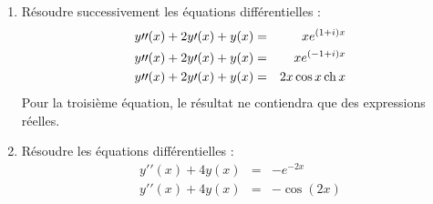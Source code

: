 \begin{enumerate}
 \item Résoudre successivement les équations différentielles :
\begin{eqnarray*}
 y\prime\prime(x)+2y\prime(x)+y(x) &=& x e^{(1+i)x}\\
y\prime\prime(x)+2y\prime(x)+y(x) &=& x e^{(-1+i)x}\\
y\prime\prime(x)+2y\prime(x)+y(x) &=& 2x \cos x \operatorname{ch} x
\end{eqnarray*}
Pour la troisième équation, le résultat ne contiendra que des expressions réelles.

\item
Résoudre les équations différentielles :
\begin{eqnarray*}
y\prime\prime(x) + 4y(x) &=& -e^{-2x}\\
y\prime\prime(x) + 4y(x) &=& -\cos (2x)
\end{eqnarray*}

\end{enumerate}


